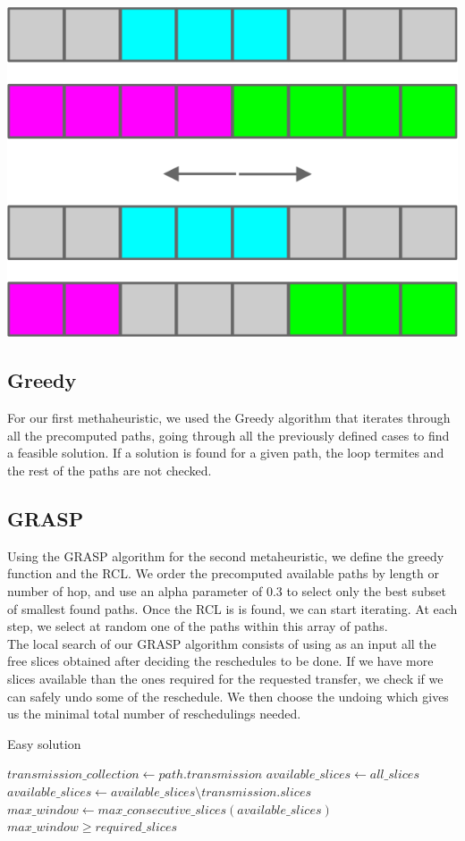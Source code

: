 \documentclass[11pt,a4paper]{article}
\begin{document}
\includegraphics[scale=1]{hardcase.jpg}

 \subsection{Greedy}
For our first methaheuristic, we used the Greedy algorithm that iterates through all the precomputed paths, going through all the previously defined cases to find a feasible solution. If a solution is found for a given path, the loop termites and the rest of the paths are not checked.
 
 \subsection{GRASP}
Using the GRASP algorithm for the second metaheuristic, we define the greedy function and the RCL. We order the precomputed available paths by length or number of hop, and use an alpha parameter of 0.3 to select only the best subset of smallest found paths. Once the RCL is is found, we can start iterating. At each step, we select at random one of the paths within this array of paths.\\

The local search of our GRASP algorithm consists of using as an input all the free slices obtained after deciding the reschedules to be done. If we have more slices available than the ones required for the requested transfer, we check if we can safely undo some of the reschedule. We then choose the undoing which gives us the minimal total number of reschedulings needed.

\begin{algorithm}
\caption{Easy solution}\label{easy_case}
\begin{algorithmic}[1]
	\State $transmission\_collection\gets path.transmission$
	\State $available\_slices\gets all\_slices$
      \State $available\_slices \gets available\_slices\setminus transmission.slices$
	\EndFor
	\State $max\_window \gets max\_consecutive\_slices(available\_slices)$
	\State \Return $max\_window \geq required\_slices$
\EndProcedure
\end{algorithmic}
\end{algorithm}
\end{document}
